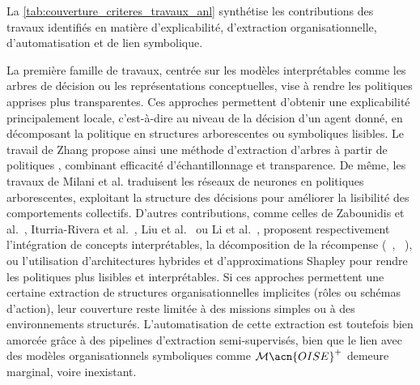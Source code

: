 La \autoref{tab:couverture_criteres_travaux_anl} synthétise les contributions des travaux identifiés en matière d'explicabilité, d'extraction organisationnelle, d'automatisation et de lien symbolique.

La première famille de travaux, centrée sur les modèles interprétables comme les arbres de décision ou les représentations conceptuelles, vise à rendre les politiques apprises plus transparentes. Ces approches permettent d’obtenir une explicabilité principalement locale, c’est-à-dire au niveau de la décision d’un agent donné, en décomposant la politique en structures arborescentes ou symboliques lisibles. Le travail de Zhang \cite{zhang2024advancing} propose ainsi une méthode d'extraction d’arbres à partir de politiques , combinant efficacité d’échantillonnage et transparence. De même, les travaux  de Milani et al. \cite{milani2022maviper,milani2024interpretable} traduisent les réseaux de neurones en politiques arborescentes, exploitant la structure des décisions pour améliorer la lisibilité des comportements collectifs. D'autres contributions, comme celles de Zabounidis et al.~\cite{zabounidis2023concept}, Iturria-Rivera et al.~\cite{iturria2024explainable}, Liu et al.~\cite{liu2025} ou Li et al.~\cite{li2025from}, proposent respectivement l'intégration de concepts interprétables, la décomposition de la récompense (~\cite{Sunehag2018}, ~\cite{Tabish2018}), ou l'utilisation d'architectures hybrides et d'approximations Shapley pour rendre les politiques plus lisibles et interprétables. Si ces approches permettent une certaine extraction de structures organisationnelles implicites (rôles ou schémas d’action), leur couverture reste limitée à des missions simples ou à des environnements structurés. L’automatisation de cette extraction est toutefois bien amorcée grâce à des pipelines d’extraction semi-supervisés, bien que le lien avec des modèles organisationnels symboliques comme $\mathcal{M}\acn{OISE}^+$ demeure marginal, voire inexistant.

